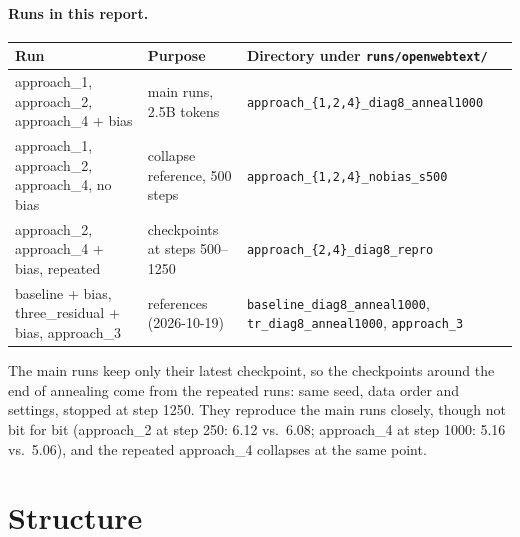 \documentclass[11pt]{article}
\newcommand{\code}[1]{\texttt{#1}}
\newcommand{\aone}{approach\_1}
\newcommand{\atwo}{approach\_2}
\newcommand{\afour}{approach\_4}
\newcommand{\tr}{three\_residual}
\begin{document}
\paragraph{Runs in this report.}
\begin{center}\footnotesize
\begin{tabularx}{\linewidth}{p{4.2cm}p{3.6cm}X}
\toprule
Run & Purpose & Directory under \code{runs/openwebtext/} \\
\midrule
\aone{}, \atwo{}, \afour{} + bias & main runs, 2.5B tokens & \code{approach\_\{1,2,4\}\_diag8\_anneal1000} \\
\aone{}, \atwo{}, \afour{}, no bias & collapse reference, 500 steps & \code{approach\_\{1,2,4\}\_nobias\_s500} \\
\atwo{}, \afour{} + bias, repeated & checkpoints at steps 500--1250 & \code{approach\_\{2,4\}\_diag8\_repro} \\
baseline + bias, \tr{} + bias, approach\_3 & references (2026-10-19) & \code{baseline\_diag8\_anneal1000}, \code{tr\_diag8\_anneal1000}, \code{approach\_3} \\
\bottomrule
\end{tabularx}
\end{center}
The main runs keep only their latest checkpoint, so the checkpoints around the end of annealing come from the
repeated runs: same seed, data order and settings, stopped at step 1250. They reproduce the main runs closely,
though not bit for bit (\atwo{} at step 250: 6.12 vs.\ 6.08; \afour{} at step 1000: 5.16 vs.\ 5.06), and the
repeated \afour{} collapses at the same point.

\section{Structure}\label{sec:structure}
\end{document}
